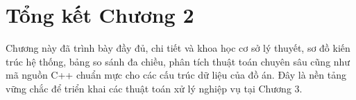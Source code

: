 \section{Tổng kết Chương 2}
Chương này đã trình bày đầy đủ, chi tiết và khoa học cơ sở lý thuyết, sơ đồ kiến trúc hệ thống, bảng so sánh đa chiều, phân tích thuật toán chuyên sâu cũng như mã nguồn C++ chuẩn mực cho các cấu trúc dữ liệu của đồ án. Đây là nền tảng vững chắc để triển khai các thuật toán xử lý nghiệp vụ tại Chương 3.
